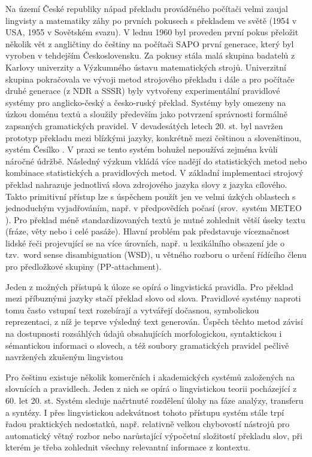 \begin{multicols}{2}
Na území České republiky nápad překladu prováděného počítači velmi zaujal lingvisty a matematiky záhy po prvních pokusech s překladem ve světě (1954 v USA, 1955 v Sovětském svazu). V lednu 1960 byl proveden první pokus přeložit několik vět z angličtiny do češtiny na počítači SAPO první generace, který byl vyroben v tehdejším Československu. Za pokusy stála malá skupina badatelů z Karlovy univerzity a Výzkumného ústavu matematických strojů. Univerzitní skupina pokračovala ve vývoji metod strojového překladu i dále a pro počítače druhé generace (z NDR a SSSR) byly vytvořeny experimentální pravidlové systémy pro anglicko-český a česko-ruský překlad. Systémy byly omezeny na úzkou doménu textů a sloužily především jako potvrzení správnosti formálně zapsaných gramatických pravidel. V devadesátých letech 20. st. byl navržen prototyp překladu mezi blízkými jazyky, konkrétně mezi češtinou a slovenštinou, systém Česílko \cite{Note18}. V praxi se tento systém bohužel nepoužívá zejména kvůli náročné údržbě. Následný výzkum vkládá více nadějí do statistických metod nebo kombinace statistických a pravidlových metod.
%
V základní implementaci strojový překlad nahrazuje jednotlivá slova zdrojového jazyka slovy z jazyka cílového. Takto primitivní přístup lze s úspěchem použít jen ve velmi úzkých oblastech s jednoduchým vyjadřováním, např. v předpovědích počasí (srov.~systém METEO \cite{Note19}). Pro překlad méně standardizovaných textů je nutné zohlednit větší úseky textu (fráze, věty nebo i celé pasáže). Hlavní problém pak představuje víceznačnost lidské řeči projevující se na více úrovních, např. u lexikálního obsazení jde o tzv.~word sense disambiguation (WSD), u větného rozboru o určení řídícího členu pro předložkové skupiny (PP-attachment).


Jeden z možných přístupů k úloze se opírá o lingvistická pravidla. Pro překlad mezi příbuznými jazyky stačí překlad slovo od slova. Pravidlové systémy naproti tomu často vstupní text rozebírají a vytvářejí dočasnou, symbolickou reprezentaci, z níž je teprve výsledný text generován. Úspěch těchto metod závisí na dostupnosti rozsáhlých údajů obsahujících morfologickou, syntaktickou i sémantickou informaci o slovech, a též soubory gramatických pravidel pečlivě navržených zkušeným lingvistou

Pro češtinu existuje několik komerčních i akademických systémů založených na slovnících a pravidlech. Jeden z nich se opírá o lingvistickou teorii pocházející z 60. let 20. st. Systém sleduje načrtnuté rozdělení úlohy na fáze analýzy, transferu a syntézy. I přes lingvistickou adekvátnost tohoto přístupu systém stále trpí řadou praktických nedostatků, např. relativně velkou chybovostí nástrojů pro automatický větný rozbor nebo narůstající výpočetní složitostí překladu slov, při kterém je třeba zohlednit všechny relevantní informace z kontextu.


\end{multicols}
